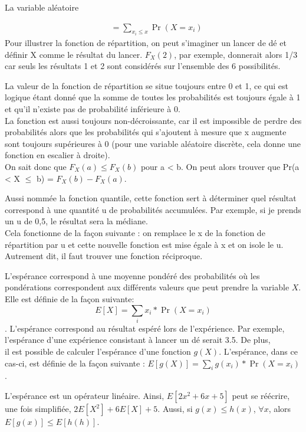 \documentclass[10pt, french]{article}
\begin{document}
\begin{multicols*}{3}
\begin{probch4}{La variable aléatoire}
\begin{description}
\begin{align*}
    &= \sum_{x_{i} \le x}^{} \Pr(X = x_{i})
    \end{align*}
    Pour illustrer la fonction de répartition, on peut s'imaginer un lancer de dé et définir X comme le résultat du lancer. $F_{X} (2)$, par exemple, donnerait alors 1/3 car seuls les résultats 1 et 2 sont considérés sur l'ensemble des 6 possibilités. 
    \item[Propriétés de la fonction de répartition :] La valeur de la fonction de répartition se situe toujours entre 0 et 1, ce qui est logique étant donné que la somme de toutes les probabilités est toujours égale à 1 et qu'il n'existe pas de probabilité inférieure à 0. \\
    La fonction est aussi toujours non-décroissante, car il est impossible de perdre des probabilités alors que les probabilités qui s'ajoutent à mesure que x augmente sont toujours supérieures à 0 (pour une variable aléatoire discrète, cela donne une fonction en escalier à droite).\\
    On sait donc que $F_{X} (a) \le F_{X} (b)$ pour a < b. On peut alors trouver que Pr(a < X $\le$ b) = $F_{X} (b) - F_{X} (a)$.
    \item[Fonction de répartition inverse ($F^{-1}_{X} (u)$):] Aussi nommée la fonction quantile, cette fonction sert à déterminer quel résultat correspond à une quantité u de probabilités accumulées. Par exemple, si je prends un u de 0,5, le résultat sera la médiane. \\
	Cela fonctionne de la façon suivante : on remplace le x de la fonction de répartition par u et cette nouvelle fonction est mise égale à x et on isole le u. Autrement dit, il faut trouver une fonction réciproque. \\
	\item[Espérance :] L'espérance correspond à une moyenne pondéré des probabilités où les pondérations correspondent aux différents valeurs que peut prendre la variable $X$. Elle est définie de la façon suivante: \\
	$$ E[X] = \sum_i x_i * \Pr(X = x_i) $$. L'espérance correspond au résultat espéré lors de l'expérience. Par exemple, l'espérance d'une expérience consistant à lancer un dé serait 3.5. De plus, \\
	il est possible de calculer l'espérance d'une fonction $g(X)$. L'espérance, dans ce cas-ci, est définie de la façon suivante : $E[g(X)] = \sum_i g(x_i) * \Pr(X = x_i) $. \\
	\item[Propriétés de l'espérance: ] L'espérance est un opérateur linéaire. Ainsi, $E[2x^2+6x+5]$ peut se réécrire, une fois simplifiée, $2E[X^2]+6E[X]+5$. Aussi, si $g(x) \le h(x)$, $\forall x$, alors $E[g(x)] \le E[h(h)]$. \\

\end{description}
\end{probch4}
\end{multicols*}
\end{document}
